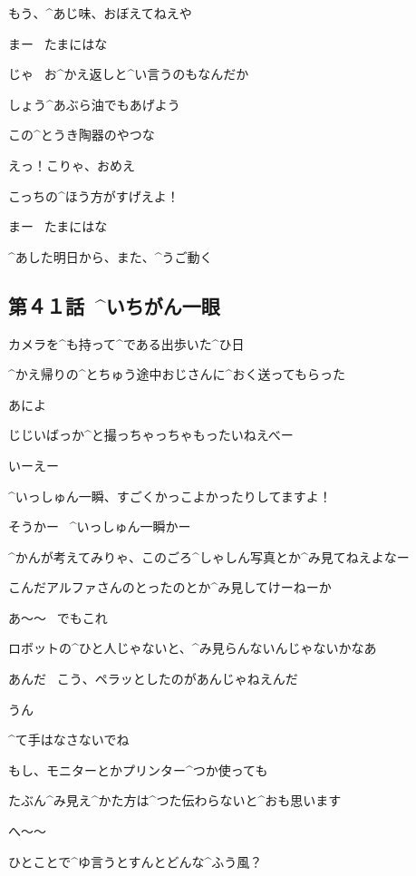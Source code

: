 \Ayase もう、^{あじ}{味}、おぼえてねえや

\Person まー
\ たまにはな

\Ayase じゃ
\ お^{かえ}{返}しと^{い}{言}うのもなんだか

\Ayase しょう^{あぶら}{油}でもあげよう

\Ayase この^{とうき}{陶器}のやつな

\Person えっ！こりゃ、おめえ

\page[123]
\Person こっちの^{ほう}{方}がすげえよ！

\Ayase まー
\ たまにはな

\page[130]
\Ayase ^{あした}{明日}から、また、^{うご}{動}く


\subsection{第４１話\ ^{いちがん}{一眼}}

\page[132]
\Alpha カメラを^{も}{持}って^{である}{出歩}いた^{ひ}{日}

\Alpha ^{かえ}{帰}りの^{とちゅう}{途中}おじさんに^{おく}{送}ってもらった

\page[133]
\Ojisan あによ

\Ojisan じじいばっか^{と}{撮}っちゃっちゃもったいねえべー

\Alpha いーえー

\Alpha ^{いっしゅん}{一瞬}、すごくかっこよかったりしてますよ！

\Ojisan そうかー
\ ^{いっしゅん}{一瞬}かー

\page[134]
\Ojisan ^{かんが}{考}えてみりゃ、このごろ^{しゃしん}{写真}とか^{み}{見}てねえよなー

\Ojisan こんだアルファさんのとったのとか^{み}{見}してけーねーか

\Alpha あ〜〜
\ でもこれ

\Alpha ロボットの^{ひと}{人}じゃないと、^{み}{見}らんないんじゃないかなあ

\Ojisan あんだ
\ こう、ペラッとしたのがあんじゃねえんだ

\Alpha うん

\Alpha ^{て}{手}はなさないでね

\Alpha もし、モニターとかプリンター^{つか}{使}っても

\Alpha たぶん^{み}{見}え^{かた}{方}は^{つた}{伝}わらないと^{おも}{思}います

\Ojisan へ〜〜

\page[135]
\Ojisan ひとことで^{ゆ}{言}うとすんとどんな^{ふう}{風}？

